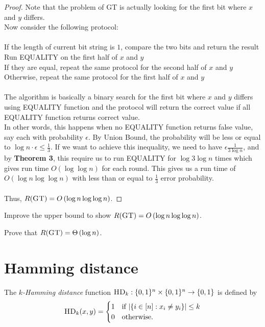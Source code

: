 \begin{proof}
	Note that the problem of GT is actually looking for the first bit where $x$ and $y$ differs. \\
	Now consider the following protocol: \\
	\\
	If the length of current bit string is $1$, compare the two bits and return the result\\
	Run EQUALITY on the first half of $x$ and $y$\\
	If they are equal, repeat the same protocol for the second half of $x$ and $y$\\
	Otherwise, repeat the same protocol for the first half of $x$ and $y$\\
	\\
	The algorithm is basically a binary search for the first bit where $x$ and $y$ differs using EQUALITY function and the protocol will return the correct value if all EQUALITY function returns correct value. \\
	In other words, this happens when no EQUALITY function returns false value, say each with probability $\epsilon$. By Union Bound, the probability will be less or equal to $\log n\cdot\epsilon \leq \frac13$. If we want to achieve this inequality, we need to have $\epsilon \frac{1}{3\log n}$, and by \textbf{Theorem 3}, this require us to run EQUALITY for $\log 3\log n$ times which gives run time $O(\log \log n)$ for each round. This gives us a run time of $O(\log n \log \log n)$ with less than or equal to $\frac13$ error probability.\\
	\\
	Thus, $R(\textsc{GT}) = O\left(\log n \log \log n \right)$.
\end{proof}

\exercises

\begin{exercise}
	Improve the upper bound to show $R(\textsc{GT}) = O\left(\log n \log \log n \right)$.
\end{exercise}

\begin{exercise}
	Prove that $R(\textsc{GT}) = \Theta\left(\log n \right)$.
\end{exercise}



\section{Hamming distance}

The \emph{$k$-Hamming distance} function $\textsc{HD}_k : \{0,1\}^n \times \{0,1\}^n \to \{0,1\}$ is defined by
\[
\textsc{HD}_k(x,y) = \begin{cases}
1 & \mbox{if } |\{i \in [n] : x_i \neq y_i\}| \le k \\
0 & \mbox{otherwise.}
\end{cases}
\]

